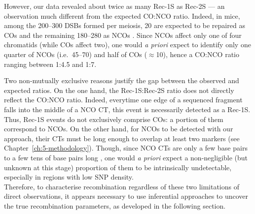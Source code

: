 However, our data revealed about twice as many Rec-1S as Rec-2S — an observation much different from the expected CO:NCO ratio.
Indeed, in mice, among the 200--300 DSBs formed per meiosis, 20 are expected to be repaired as COs and the remaining 180--280 as NCOs \citep{baudat2007regulating, martinez-perez2009distribution}. 
Since NCOs affect only one of four chromatids (while COs affect two), one would \textit{a priori} expect to identify only one quarter of NCOs (i.e.\ 45--70) and half of COs ($\approx$10), hence a CO:NCO ratio ranging between 1:4.5 and 1:7. 

Two non-mutually exclusive reasons justify the gap between the observed and expected ratios.
On the one hand, the Rec-1S:Rec-2S ratio does not directly reflect the CO:NCO ratio.
Indeed, everytime one edge of a sequenced fragment falls into the middle of a NCO CT, this event is necessarily detected as a Rec-1S. 
Thus, Rec-1S events do not exclusively comprise COs: a portion of them correspond to NCOs.
On the other hand, for NCOs to be detected with our approach, their CTs must be long enough to overlap at least two markers (see Chapter~\ref{ch:5-methodology}).
Though, since NCO CTs are only a few base pairs to a few tens of base pairs long \citep{cole2014mouse}, one would \textit{a priori} expect a non-negligible (but unknown at this stage) proportion of them to be intrinsically undetectable, especially in regions with low SNP density.\\

Therefore, to characterise recombination regardless of these two limitations of direct observations, it appears necessary to use inferential approaches to uncover the true recombination parameters, as developed in the following section.



